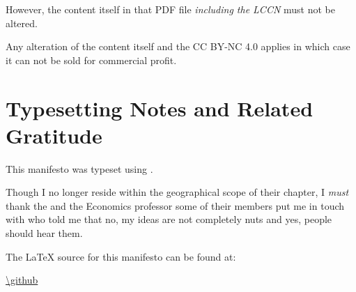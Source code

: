 However, the content itself in that PDF file \emph{including the LCCN} must not be altered.

Any alteration of the content itself and the CC BY-NC 4.0 applies in which case it can not be sold for commercial profit.

\clearpage

\section{Typesetting Notes and Related Gratitude}

This manifesto was typeset using .

\bigskip


\noindent Though I no longer reside within the geographical scope of their chapter, I \emph{must} thank the  and the Economics professor some of their members put me in touch with who told me that no, my ideas are not completely nuts and yes, people should hear them.

\bigskip

\noindent The \LaTeX{} source for this manifesto can be found at:

\bigskip

\url{\github} 
